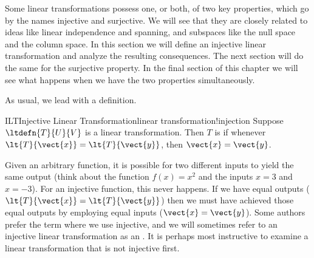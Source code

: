 %
Some linear transformations possess one, or both, of two key properties, which go by the names injective and surjective.  We will see that they are closely related to ideas like linear independence and spanning, and subspaces like the null space and the column space.  In this section we will define an injective linear transformation and analyze the resulting consequences.  The next section will do the same for the surjective property.  In the final section of this chapter we will see what happens when we have the two properties simultaneously.\par
%
As usual, we lead with a definition.
%
\begin{definition}{ILT}{Injective Linear Transformation}{linear transformation!injection}
Suppose $\ltdefn{T}{U}{V}$ is a linear transformation.  Then $T$ is  if whenever $\lt{T}{\vect{x}}=\lt{T}{\vect{y}}$, then $\vect{x}=\vect{y}$.
\end{definition}
%
Given an arbitrary function, it is possible for two different inputs to yield the same output (think about the function $f(x)=x^2$ and the inputs $x=3$ and $x=-3$).  For an injective function, this never happens.  If we have equal outputs ($\lt{T}{\vect{x}}=\lt{T}{\vect{y}}$) then we must have achieved those equal outputs by employing equal inputs ($\vect{x}=\vect{y}$).  Some authors prefer the term  where we use injective, and we will sometimes refer to an injective linear transformation as an .
%
%
It is perhaps most instructive to examine a linear transformation that is not injective first.
%
